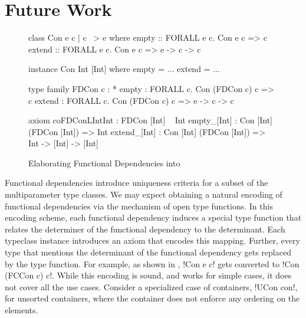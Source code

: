 \documentclass[screen,nonacm,manuscript,review]{acmart} %
\begin{document}
\section{Future Work}\label{sec:future-work}
\begin{figure}[ht]
\begin{minipage}{0.4\linewidth}
\begin{CenteredBox}
\begin{code}
class Con e c | c ~> e where
  empty :: FORALL e c. Con e c => c
  extend :: FORALL e c. Con e c => e -> c -> c

instance Con Int [Int] where
  empty = ...
  extend = ...
\end{code}
\end{CenteredBox}
\end{minipage}%
\begin{minipage}{0.6\linewidth}
\begin{CenteredBox}
\begin{code}
type family FDCon c : *
empty : FORALL c. Con (FDCon c) c => c
extend : FORALL c. Con (FDCon c) c => e -> c -> c

axiom coFDConLIntInt : FDCon [Int] ~ Int
empty_[Int]  : Con [Int] (FDCon [Int]) => Int
extend_[Int] : Con [Int] (FDCon [Int]) => Int -> [Int] -> [Int]

\end{code}
\end{CenteredBox}
\end{minipage}
\caption[FunDeps in \SFC]{Elaborating Functional Dependencies into \SFC}
\label{fig:elab-fundeps-sfc}
\end{figure}
Functional dependencies introduce
uniqueness criteria for a subset of the multiparameter type classes.
We may expect obtaining a natural encoding of functional dependencies
via the mechanism of open type functions. In this encoding scheme,
each functional dependency induces a special
type function that relates the determiner of the functional dependency
to the determinant. Each typeclass instance introduces an axiom that
encodes this mapping. Further, every type that mentions the
determinant of the functional dependency gets replaced by the type
function. For example, as shown in ,
!Con e c! gets converted to !Con (FCCon c) c!. While this encoding is
sound, and works for simple cases, it does not cover all the use cases.
Consider a specialized case of containers, !UCon con!, for unsorted containers,
where the container does not enforce any ordering on the elements.
\end{document}
